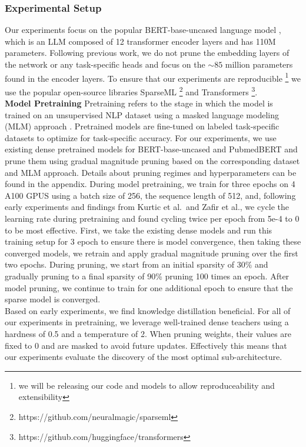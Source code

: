 \subsubsection{Experimental Setup}
Our experiments focus on the popular BERT-base-uncased language model \cite{Devlin2019BERTPO}, which is an LLM composed of 12 transformer encoder layers and has 110M parameters. Following previous work, we do not prune the embedding layers of the network or any task-specific heads and focus on the $\sim\!85$ million parameters found in the encoder layers. To ensure that our experiments are reproducible \footnote{we will be releasing our code and models to allow reproduceability and extensibility} we use the popular open-source libraries SparseML \footnote{https://github.com/neuralmagic/sparseml} and Transformers \footnote{https://github.com/huggingface/transformers}. \\
\textbf{Model Pretraining}
Pretraining refers to the stage in which the model is trained on an unsupervised NLP dataset using a masked language modeling (MLM) approach \cite{Devlin2019BERTPO}. Pretrained models are fine-tuned on labeled task-specific datasets to optimize for task-specific accuracy.
For our experiments, we use existing dense pretrained models for BERT-base-uncased \cite{Devlin2019BERTPO} and PubmedBERT \cite{Gu2022DomainSpecificLM} and prune them using gradual magnitude pruning based on the corresponding dataset and MLM approach. Details about pruning regimes and hyperparameters can be found in the appendix.
During model pretraining, we train for three epochs on 4 A100 GPUS using a batch size of 256, the sequence length of 512, and, following early experiments and findings from Kurtic et al.\ and Zafir et al., we cycle the learning rate during pretraining and found cycling twice per epoch from 5e-4 to 0 to be most effective. First, we take the existing dense models and run this training setup for 3 epoch to ensure there is model convergence, then taking these converged models, we retrain and apply gradual magnitude pruning over the first two epochs. During pruning, we start from an initial sparsity of $30\%$ and gradually pruning to a final sparsity of 90\% pruning 100 times an epoch. After model pruning, we continue to train for one additional epoch to ensure that the sparse model is converged.  \\
Based on early experiments, we find knowledge distillation beneficial. For all of our experiments in pretraining, we leverage well-trained dense teachers using a hardness of  0.5 and a temperature of 2. When pruning weights, their values are fixed to 0 and are masked to avoid future updates. Effectively this means that our experiments evaluate the discovery of the most optimal sub-architecture. \\
